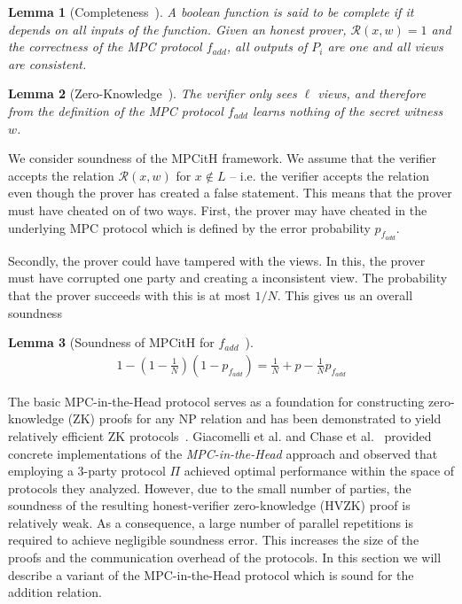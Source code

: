 \documentclass[11pt]{report}
\theoremstyle{definition}
\theoremstyle{plain}
\newtheorem{lemma}{Lemma}[section]
\begin{document}
\begin{lemma}[Completeness~\cite{ishai2007zero}]\label{def:mpcinth_completeness}
  A boolean function is said to be complete if it depends on all inputs of the function. Given an honest prover, $\mathcal{R}(x,w) = 1$ and the correctness of the MPC protocol $f_{add}$, all outputs of $P_i$ are one and all views are consistent.
\end{lemma}

\begin{lemma}[Zero-Knowledge~\cite{ishai2007zero}]
  The verifier only sees $\ell$ views, and therefore from the definition of the MPC protocol $f_{add}$ learns nothing of the secret witness $w$.
\end{lemma}

We consider soundness of the MPCitH framework. We assume that the verifier accepts the relation $\mathcal{R}(x,w)$ for $x \notin L$ -- i.e. the verifier accepts the relation even though the prover has created a false statement. This means that the prover must have cheated on of two ways. First, the prover may have cheated in the underlying MPC protocol which is defined by the error probability $p_{f_{add}}$.

Secondly, the prover could have tampered with the views. In this, the prover must have corrupted one party and creating a inconsistent view. The probability that the prover succeeds with this is at most $1 / N$. This gives us an overall soundness

\begin{lemma}[Soundness of MPCitH for $f_{add}$~\cite{feneuil2022syndrome}]\label{lem:soundness_mpcinth}
  \begin{align*}
    1 - (1 - \frac{1}{N}) (1 - p_{f_{add}}) = \frac{1}{N} + p - \frac{1}{N} p_{f_{add}}
  \end{align*}
\end{lemma}

The basic MPC-in-the-Head protocol serves as a foundation for constructing zero-knowledge (ZK) proofs for any NP relation and has been demonstrated to yield relatively efficient ZK protocols~\cite{feneuil2022syndrome,baum2020concretely,katz2018improved}. Giacomelli et al. and Chase et al.~\cite{katz2018improved,giacomelli2016zkboo,chase2017post} provided concrete implementations of the \emph{MPC-in-the-Head} approach and observed that employing a 3-party protocol $\Pi$ achieved optimal performance within the space of protocols they analyzed. However, due to the small number of parties, the soundness of the resulting honest-verifier zero-knowledge (HVZK) proof is relatively weak. As a consequence, a large number of parallel repetitions is required to achieve negligible soundness error. This increases the size of the proofs and the communication overhead of the protocols. In this section we will describe a variant of the MPC-in-the-Head protocol which is sound for the addition relation.
\end{document}
